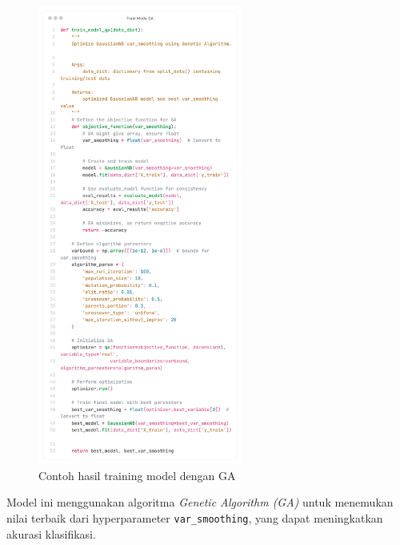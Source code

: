 \begin{figure}[H]
  \centering
  \includegraphics[width=0.6\textwidth]{figure/chapter-4-train_model_ga.png}
  \caption{Contoh hasil training model dengan GA}
  \label{fig:extract_rgb}
\end{figure}

Model ini menggunakan algoritma \textit{Genetic Algorithm (GA)} untuk menemukan nilai terbaik dari hyperparameter \texttt{var\_smoothing}, yang dapat meningkatkan akurasi klasifikasi.

